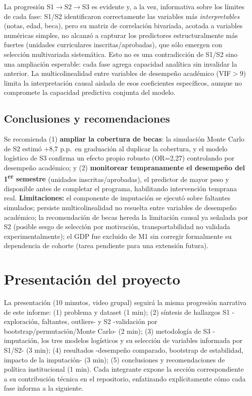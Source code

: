 \documentclass[11pt,a4paper]{article}
\begin{document}
La progresión S1$\to$S2$\to$S3 es evidente y, a la vez, informativa sobre los límites de cada
fase: S1/S2 identificaron correctamente las variables más \emph{interpretables} (notas, edad,
beca), pero su matriz de correlación bivariada, acotada a variables numéricas simples, no alcanzó
a capturar los predictores estructuralmente más fuertes (unidades curriculares
inscritas/aprobadas), que sólo emergen con selección multivariada sistemática. Esto no es una
contradicción de S1/S2 sino una ampliación esperable: cada fase agrega capacidad analítica sin
invalidar la anterior. La multicolinealidad entre variables de desempeño académico (VIF$>9$) limita
la interpretación causal aislada de esos coeficientes específicos, aunque no compromete la
capacidad predictiva conjunta del modelo.

\subsection{Conclusiones y recomendaciones}

Se recomienda (1) \textbf{ampliar la cobertura de becas}: la simulación Monte Carlo de S2 estimó
+8{,}7 p.p.\ en graduación al duplicar la cobertura, y el modelo logístico de S3 confirma un
efecto propio robusto (OR=2{,}27) controlando por desempeño académico; y (2) \textbf{monitorear
tempranamente el desempeño del 1\textsuperscript{er} semestre} (unidades inscritas/aprobadas), el
predictor de mayor peso y disponible antes de completar el programa, habilitando intervención
temprana real. \textbf{Limitaciones:} el componente de imputación se ejecutó sobre faltantes
simulados; persiste multicolinealidad no resuelta entre variables de desempeño académico; la
recomendación de becas hereda la limitación causal ya señalada por S2 (posible sesgo de selección
por motivación, transportabilidad no validada experimentalmente); el GDP fue excluido de M1 sin
corregir formalmente su dependencia de cohorte (tarea pendiente para una extensión futura).

\section{Presentación del proyecto}

La presentación (10 minutos, video grupal) seguirá la misma progresión narrativa de este informe:
(1) problema y dataset (1 min); (2) síntesis de hallazgos S1 -exploración, faltantes, outliers- y
S2 -validación por bootstrap/permutación/Monte Carlo- (2 min); (3) metodología de S3 -imputación,
los tres modelos logísticos y su selección de variables informada por S1/S2- (3 min); (4)
resultados -desempeño comparado, bootstrap de estabilidad, impacto de la imputación- (3 min); (5)
conclusiones y recomendaciones de política institucional (1 min). Cada integrante expone la
sección correspondiente a su contribución técnica en el repositorio, enfatizando explícitamente
cómo cada fase informa a la siguiente.
\end{document}
